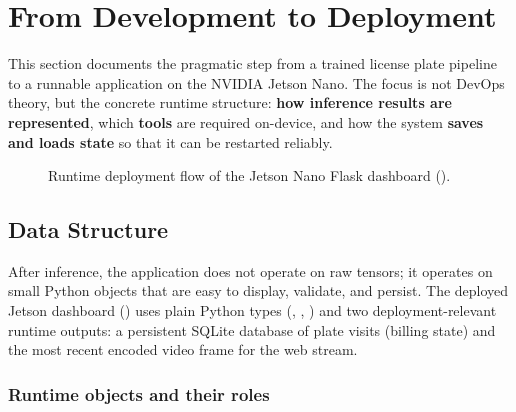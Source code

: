 %
%
%
\chapter{From Development to Deployment}
\label{sec:from_dev_to_dep}

\noindent
This section documents the pragmatic step from a trained license plate pipeline to a runnable application on the NVIDIA Jetson Nano.
The focus is not DevOps theory, but the concrete runtime structure: \textbf{how inference results are represented}, which \textbf{tools} are required on-device, and how the system \textbf{saves and loads state} so that it can be restarted reliably.

\begin{figure}[htbp]
	\centering
	
	\caption{Runtime deployment flow of the Jetson Nano Flask dashboard ().}
	\label{fig:dev_to_deploy_runtime}
\end{figure}

\section{Data Structure}
\label{sec:devtodep_data_structure}

\noindent
After inference, the application does not operate on raw tensors; it operates on small Python objects that are easy to display, validate, and persist.
The deployed Jetson dashboard () uses plain Python types (, , ) and two deployment-relevant runtime outputs: a persistent SQLite database of plate visits (billing state) and the most recent encoded video frame for the web stream.

\subsection{Runtime objects and their roles}

